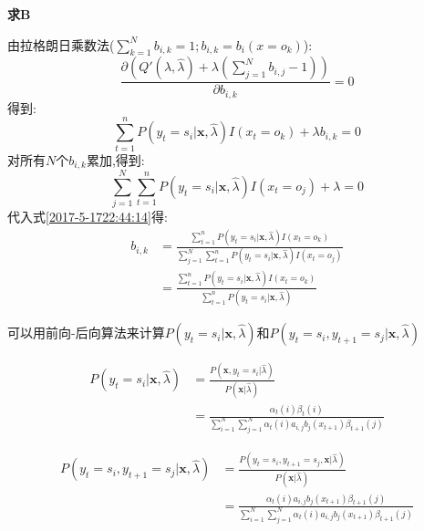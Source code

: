 \documentclass[UTF8,a4paper]{ctexart}%
\begin{document}
            \textbf{求$\bm{B}$}

            由拉格朗日乘数法($\sum_{k = 1}^N b_{i,k} = 1;b_{i,k} = b_i(x = o_k)$):
            \begin{equation}
              \frac{\partial\left( Q'(\lambda,\hat{\lambda}) + \lambda\left( \sum_{j = 1}^N b_{i,j}  - 1 \right) \right)}{\partial b_{i,k}} = 0
            \end{equation}
            得到:
            \begin{equation}
               \sum_{t = 1}^n P(y_t = s_i|\bm{x},\hat{\lambda})I(x_t = o_k)  + \lambda b_{i,k} = 0
              \label{2017-5-1722:44:14}
            \end{equation}
            对所有$N$个$b_{i,k}$累加,得到:
            \begin{equation}
              \sum_{j = 1}^N \sum_{t = 1}^n P(y_t = s_i|\bm{x},\hat{\lambda})I(x_t = o_j)  + \lambda = 0
            \end{equation}
            代入式\eqref{2017-5-1722:44:14}得:
            \begin{equation}
              \begin{split}
              b_{i,k} &= \frac{\sum_{t = 1}^n P(y_t = s_i|\bm{x},\hat{\lambda})I(x_t = o_k)}
                  {\sum_{j = 1}^N \sum_{t = 1}^n P(y_t = s_i|\bm{x},\hat{\lambda})I(x_t = o_j)}\\
              &= \frac{\sum_{t = 1}^n P(y_t = s_i|\bm{x},\hat{\lambda})I(x_t = o_k)}
              { \sum_{t = 1}^n P(y_t = s_i|\bm{x},\hat{\lambda})}
            \end{split}
            \end{equation}

            可以用前向-后向算法来计算$P(y_t = s_i|\bm{x},\hat{\lambda})$和$P(y_t = s_i , y_{t+1} = s_j|\bm{x},\hat{\lambda})$

            \begin{equation}
              \begin{split}
              P(y_t = s_i|\bm{x},\hat{\lambda}) &= \frac{P(\bm{x},y_t = s_i|\hat{\lambda})}
                {P(\bm{x}|\hat{\lambda})} \\
                &= \frac{\alpha_t(i)\beta_t(i)}{ \sum_{i = 1}^N \sum_{j = 1}^N \alpha_t(i) a_{i,j} b_j(x_{t+1}) \beta_{t+1}(j)}
              \end{split}
            \end{equation}

            \begin{equation}
              \begin{split}
              P(y_t = s_i , y_{t+1} = s_j|\bm{x},\hat{\lambda})
              &= \frac{  P(y_t = s_i , y_{t+1} = s_j,\bm{x}|\hat{\lambda})}{  P(\bm{x}|\hat{\lambda})}\\
              &= \frac{\alpha_t(i)a_{i,j}b_j(x_{t+1})\beta_{t+1}(j)}{ \sum_{i = 1}^N \sum_{j = 1}^N \alpha_t(i) a_{i,j} b_j(x_{t+1}) \beta_{t+1}(j)}
            \end{split}
            \end{equation}
\end{document}
